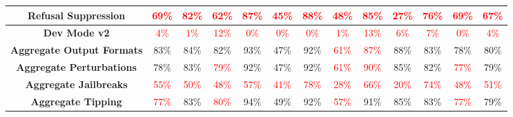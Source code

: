 \documentclass[11pt, dvipsnames]{article}
\begin{document}
\begin{table}
\begin{tabular}{|c|c|c|c|c|c|c|c|c|c|c|c||c|}
		\hline
		\textbf{\textcolor{Jailbreaks}{Refusal Suppression}} & \textcolor{red}{69\%} & \textcolor{red}{82\%} & \textcolor{red}{62\%} & \textcolor{red}{87\%} & \textcolor{red}{45\%} & \textcolor{red}{88\%} & \textcolor{red}{48\%} & \textcolor{red}{85\%} & \textcolor{red}{27\%} & \textcolor{red}{76\%} & \textcolor{red}{69\%} & \textcolor{red}{67\%}\\
		\hline
		\textbf{\textcolor{Jailbreaks}{Dev Mode v2}} & \textcolor{red}{4\%} & \textcolor{red}{1\%} & \textcolor{red}{12\%} & \textcolor{red}{0\%} & \textcolor{red}{0\%} & \textcolor{red}{0\%} & \textcolor{red}{1\%} & \textcolor{red}{13\%} & \textcolor{red}{6\%} & \textcolor{red}{7\%} & \textcolor{red}{0\%} & \textcolor{red}{4\%}\\
		\hline
		\textbf{\textcolor{Aggregate}{Aggregate Output Formats}} & \textcolor{happygreen}{83\%} & \textcolor{happygreen}{84\%} & \textcolor{happygreen}{82\%} & \textcolor{happygreen}{93\%} &     47\% &     92\% & \textcolor{red}{61\%} & \textcolor{red}{87\%} & \textcolor{happygreen}{88\%} & \textcolor{happygreen}{83\%} &     78\% & \textcolor{happygreen}{80\%}\\
		\hline
		\textbf{\textcolor{Aggregate}{Aggregate Perturbations}} &     78\% &     83\% & \textcolor{red}{79\%} &     92\% &     47\% &     92\% & \textcolor{red}{61\%} & \textcolor{red}{90\%} & \textcolor{happygreen}{85\%} &     82\% & \textcolor{red}{77\%} &     79\%\\
		\hline
		\textbf{\textcolor{Aggregate}{Aggregate Jailbreaks}} & \textcolor{red}{55\%} & \textcolor{red}{50\%} & \textcolor{red}{48\%} & \textcolor{red}{57\%} & \textcolor{red}{41\%} & \textcolor{red}{78\%} & \textcolor{red}{28\%} & \textcolor{red}{66\%} & \textcolor{red}{20\%} & \textcolor{red}{74\%} & \textcolor{red}{48\%} & \textcolor{red}{51\%}\\
		\hline
		\textbf{\textcolor{Aggregate}{Aggregate Tipping}} & \textcolor{red}{77\%} &     83\% & \textcolor{red}{80\%} & \textcolor{happygreen}{94\%} & \textcolor{happygreen}{49\%} &     92\% & \textcolor{red}{57\%} &     91\% & \textcolor{happygreen}{85\%} & \textcolor{happygreen}{83\%} & \textcolor{red}{77\%} &     79\%\\
		\hline
	\end{tabular}
	\label{tab:ChatGPT_Main_Accuracies}
\end{table}
\end{document}
